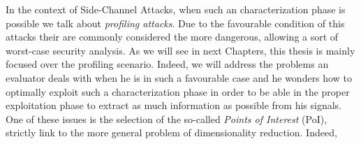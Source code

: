 In the context of Side-Channel Attacks, when such an characterization phase is possible we talk about \emph{profiling attacks}. Due to the favourable condition of this attacks their are commonly considered the more dangerous, allowing a sort of worst-case security analysis. As we will see in next Chapters, this thesis is mainly focused over the profiling scenario. Indeed, we will address the problems an evaluator deals with when he is in such a favourable case and he wonders how to optimally exploit such a characterization phase in order to be able in the proper exploitation phase to extract as much information as possible from his signals. One of these issues is the selection of the so-called \emph{Points of Interest} (PoI), strictly link to the more general problem of dimensionality reduction. Indeed, 

